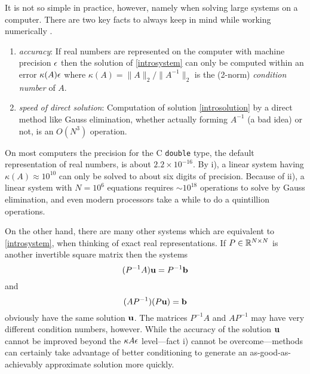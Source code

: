 It is not so simple in practice, however, namely when solving large systems on a computer.  There are two key facts to always keep in mind while working numerically  \citep{TrefethenBau}.
\renewcommand{\labelenumi}{\roman{enumi})}
\begin{enumerate}
\item \emph{accuracy}:  If real numbers are represented on the computer with machine precision $\epsilon$ then the solution of \eqref{introsystem} can only be computed within an error $\kappa(A) \epsilon$ where $\kappa(A) = \|A\|_2/\|A^{-1}\|_2$ is the (2-norm) \emph{condition number} of $A$.
\item \emph{speed of direct solution}:  Computation of solution \eqref{introsolution} by a direct method like Gauss elimination, whether actually forming $A^{-1}$ (a bad idea) or not, is an $O(N^3)$ operation.
\end{enumerate}
On most computers the precision for the C \texttt{double} type, the default representation of real numbers, is about $2.2 \times 10^{-16}$.  By i), a linear system having $\kappa(A) \approx 10^{10}$ can only be solved to about six digits of precision.  Because of ii), a linear system with $N=10^6$ equations requires $\sim 10^{18}$ operations to solve by Gauss elimination, and even modern processors take a while to do a quintillion operations.

On the other hand, there are many other systems which are equivalent to \eqref{introsystem}, when thinking of exact real representations.  If $P\in\mathbb{R}^{N\times N}$ is another invertible square matrix then the systems
\begin{equation}
(P^{-1} A) \mathbf{u} = P^{-1} \mathbf{b} \label{introleftpre}
\end{equation}
and
\begin{equation}
(A P^{-1}) (P\mathbf{u}) = \mathbf{b} \label{introrightpre}
\end{equation}
obviously have the same solution $\mathbf{u}$.  The matrices $P^{-1} A$ and $A P^{-1}$ may have very different condition numbers, however.  While the accuracy of the solution $\mathbf{u}$ cannot be improved beyond the $\kappa{A} \epsilon$ level---fact i) cannot be overcome---methods can certainly take advantage of better conditioning to generate an as-good-as-achievably approximate solution more quickly.

